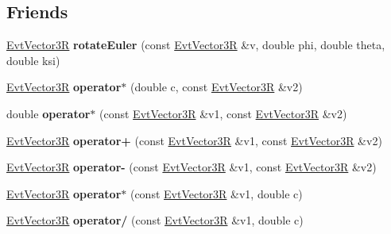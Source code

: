 \subsection*{Friends}
\begin{DoxyCompactItemize}
\item 
\hypertarget{class_evt_vector3_r_a15f5becc2d4c1333e61ff0ca3d4b1cbe}{}\hyperlink{class_evt_vector3_r}{Evt\+Vector3\+R} {\bfseries rotate\+Euler} (const \hyperlink{class_evt_vector3_r}{Evt\+Vector3\+R} \&v, double phi, double theta, double ksi)\label{class_evt_vector3_r_a15f5becc2d4c1333e61ff0ca3d4b1cbe}

\item 
\hypertarget{class_evt_vector3_r_a10fa3271743ba195f86d9f84e487e936}{}\hyperlink{class_evt_vector3_r}{Evt\+Vector3\+R} {\bfseries operator$\ast$} (double c, const \hyperlink{class_evt_vector3_r}{Evt\+Vector3\+R} \&v2)\label{class_evt_vector3_r_a10fa3271743ba195f86d9f84e487e936}

\item 
\hypertarget{class_evt_vector3_r_a5378419e3e06cf474cb940a6bae9a520}{}double {\bfseries operator$\ast$} (const \hyperlink{class_evt_vector3_r}{Evt\+Vector3\+R} \&v1, const \hyperlink{class_evt_vector3_r}{Evt\+Vector3\+R} \&v2)\label{class_evt_vector3_r_a5378419e3e06cf474cb940a6bae9a520}

\item 
\hypertarget{class_evt_vector3_r_aa2a37b793921ece2326a1159f0e55a79}{}\hyperlink{class_evt_vector3_r}{Evt\+Vector3\+R} {\bfseries operator+} (const \hyperlink{class_evt_vector3_r}{Evt\+Vector3\+R} \&v1, const \hyperlink{class_evt_vector3_r}{Evt\+Vector3\+R} \&v2)\label{class_evt_vector3_r_aa2a37b793921ece2326a1159f0e55a79}

\item 
\hypertarget{class_evt_vector3_r_aebc3fddc45beb56704f44137b31a4cc3}{}\hyperlink{class_evt_vector3_r}{Evt\+Vector3\+R} {\bfseries operator-\/} (const \hyperlink{class_evt_vector3_r}{Evt\+Vector3\+R} \&v1, const \hyperlink{class_evt_vector3_r}{Evt\+Vector3\+R} \&v2)\label{class_evt_vector3_r_aebc3fddc45beb56704f44137b31a4cc3}

\item 
\hypertarget{class_evt_vector3_r_a24ca7121d8248485f6b1dabcf43b65ad}{}\hyperlink{class_evt_vector3_r}{Evt\+Vector3\+R} {\bfseries operator$\ast$} (const \hyperlink{class_evt_vector3_r}{Evt\+Vector3\+R} \&v1, double c)\label{class_evt_vector3_r_a24ca7121d8248485f6b1dabcf43b65ad}

\item 
\hypertarget{class_evt_vector3_r_a18ddc0009287ba0ea88360827578ab74}{}\hyperlink{class_evt_vector3_r}{Evt\+Vector3\+R} {\bfseries operator/} (const \hyperlink{class_evt_vector3_r}{Evt\+Vector3\+R} \&v1, double c)\label{class_evt_vector3_r_a18ddc0009287ba0ea88360827578ab74}


\end{DoxyCompactItemize}
